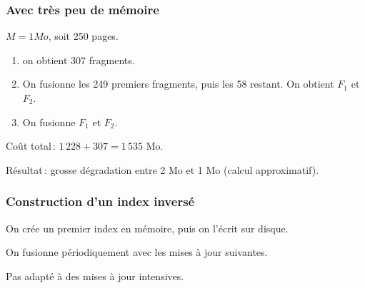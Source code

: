 \begin{frame}

\frametitle{Avec très peu de mémoire}
\textbf{$M = 1 Mo$}, soit 250 pages.
    \begin{enumerate}
       \item on obtient 307 fragments.

       \item On fusionne les 249 premiers fragments,
               puis les 58 restant. On obtient $F_1$ et $F_2$.
        \item On fusionne $F_1$ et $F_2$.
   \end{enumerate}

\medskip

 Coût total\,: $1\,228 + 307 = 1\,535$ Mo.

\medskip

Résultat\,: grosse dégradation entre 2 Mo et 1 Mo (calcul
approximatif).

\end{frame}


\begin{frame}
\frametitle{Construction d'un index inversé}

On crée un premier index en mémoire, puis on l'écrit sur  disque.


On \alert{fusionne} périodiquement avec les mises à jour suivantes.

\begin{remark}
Pas adapté à des mises à jour intensives.
\end{remark}
\end{frame}


